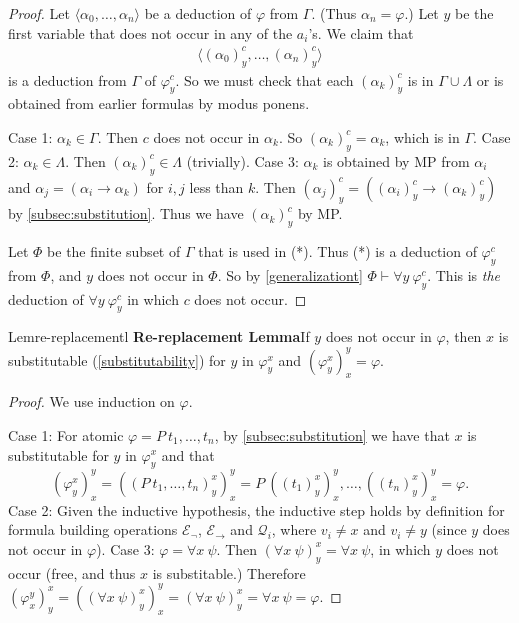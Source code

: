 \begin{proof}
  Let $\langle \alpha_0,\dots,\alpha_n\rangle$ be a deduction of $\varphi$ from $\Gamma$. (Thus $\alpha_n=\varphi$.) Let $y$ be the first variable that does not occur in any of the $a_i$'s. We claim that
  \begin{align}
    \langle (\alpha_0)_y^c,\dots,(\alpha_n)_y^c\rangle\tag{*}
  \end{align}
  is a deduction from $\Gamma$ of $\varphi_y^c$. So we must check that each $(\alpha_k)_y^c$ is in $\Gamma\cup \Lambda$ or is obtained from earlier formulas by modus ponens.

  Case 1: $\alpha_k\in \Gamma$. Then $c$ does not occur in $\alpha_k$. So $(\alpha_k)_y^c=\alpha_k$, which is in $\Gamma$.\newline
  Case 2: $\alpha_k\in \Lambda$. Then $(\alpha_k)_y^c\in \Lambda$ (trivially).\newline
  Case 3: $\alpha_k$ is obtained by MP from $\alpha_i$ and $\alpha_j=(\alpha_i\rightarrow \alpha_k)$ for $i,j$ less than $k.$ Then $(\alpha_j)_y^c=((\alpha_i)_y^c\rightarrow(\alpha_k)_y^c)$ by \ref{subsec:substitution}. Thus we have $(\alpha_k)_y^c$ by MP.

  Let $\Phi$ be the finite subset of $\Gamma$ that is used in (*). Thus (*) is a deduction of $\varphi_y^c$ from $\Phi$, and $y$ does not occur in $\Phi$. So by \ref{generalizationt} $\Phi\vdash\forall y\ \varphi_y^c$. This is \textit{the} deduction of $\forall y\ \varphi_y^c$ in which $c$ does not occur.
\end{proof}

\begin{reference}{Lem}{re-replacementl}
  \textbf{Re-replacement Lemma}\quad If $y$ does not occur in $\varphi$, then $x$ is substitutable (\ref{substitutability}) for $y$ in $\varphi_y^x$ and $(\varphi_y^x)_x^y=\varphi$.
\end{reference}

\begin{proof}
  We use induction on $\varphi$.

  Case 1: For atomic $\varphi=P\ t_1,\dots,t_n$, by \ref{subsec:substitution} we have that $x$ is substitutable for $y$ in $\varphi_y^x$ and that
  \[
    (\varphi_y^x)_x^y = ((P\ t_1,\dots,t_n)_y^x)_x^y = P\ ((t_1)_y^x)_x^y,\dots,((t_n)_y^x)_x^y=\varphi.
  \]
  Case 2: Given the inductive hypothesis, the inductive step holds by definition for formula building operations $\mathcal{E}_{\neg}$, $\mathcal{E}_{\rightarrow}$ and $\mathcal{Q}_i$, where $v_i\neq x$ and $v_i\neq y$ (since $y$ does not occur in $\varphi$).\newline
  Case 3: $\varphi=\forall x\ \psi$. Then $(\forall x\ \psi)_y^x=\forall x\ \psi$, in which $y$ does not occur (free, and thus $x$ is substitable.) Therefore $(\varphi_x^y)_y^x=((\forall x\ \psi)_y^x)_x^y=(\forall x\ \psi)_y^x=\forall x\ \psi=\varphi$.
\end{proof}

